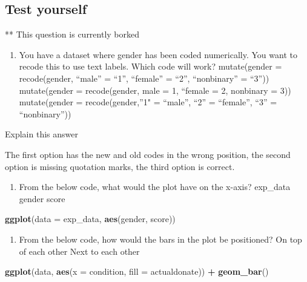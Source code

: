 \documentclass[]{book}
\newenvironment{Shaded}{\begin{snugshade}}{\end{snugshade}}
\newcommand{\DataTypeTok}[1]{\textcolor[rgb]{0.13,0.29,0.53}{#1}}
\newcommand{\KeywordTok}[1]{\textcolor[rgb]{0.13,0.29,0.53}{\textbf{#1}}}
\newcommand{\NormalTok}[1]{#1}
\newcommand{\OperatorTok}[1]{\textcolor[rgb]{0.81,0.36,0.00}{\textbf{#1}}}
\newcommand{\StringTok}[1]{\textcolor[rgb]{0.31,0.60,0.02}{#1}}
\providecommand{\tightlist}{%
  \setlength{\itemsep}{0pt}\setlength{\parskip}{0pt}}
\begin{document}
\hypertarget{test-yourself-4}{%
\subsection{Test yourself}\label{test-yourself-4}}

** This question is currently borked

\begin{enumerate}
\def\labelenumi{\arabic{enumi}.}
\tightlist
\item
  You have a dataset where gender has been coded numerically. You want to recode this to use text labels. Which code will work? mutate(gender = recode(gender, ``male'' = ``1'', ``female'' = ``2'', ``nonbinary'' = ``3'')) mutate(gender = recode(gender, male = 1, ``female = 2, nonbinary = 3)) mutate(gender = recode(gender,''1" = ``male'', ``2'' = ``female'', ``3'' = ``nonbinary''))
\end{enumerate}

Explain this answer

The first option has the new and old codes in the wrong position, the second option is missing quotation marks, the third option is correct.

\begin{enumerate}
\def\labelenumi{\arabic{enumi}.}
\setcounter{enumi}{1}
\tightlist
\item
  From the below code, what would the plot have on the x-axis? exp\_data gender score
\end{enumerate}

\begin{Shaded}
\begin{Highlighting}[]
\KeywordTok{ggplot}\NormalTok{(}\DataTypeTok{data =}\NormalTok{ exp_data, }\KeywordTok{aes}\NormalTok{(gender, score))}
\end{Highlighting}
\end{Shaded}

\begin{enumerate}
\def\labelenumi{\arabic{enumi}.}
\setcounter{enumi}{2}
\tightlist
\item
  From the below code, how would the bars in the plot be positioned? On top of each other Next to each other
\end{enumerate}

\begin{Shaded}
\begin{Highlighting}[]
\KeywordTok{ggplot}\NormalTok{(data, }\KeywordTok{aes}\NormalTok{(}\DataTypeTok{x =}\NormalTok{ condition, }\DataTypeTok{fill =}\NormalTok{ actualdonate)) }\OperatorTok{+}
\StringTok{  }\KeywordTok{geom_bar}\NormalTok{()}
\end{Highlighting}
\end{Shaded}
\end{document}
